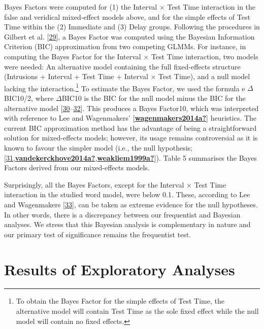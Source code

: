 \documentclass[
]{article}
\begin{document}
Bayes Factors were computed for (1) the Interval \(\times\) Test Time interaction in the false and veridical mixed-effect models above, and for the simple effects of Test Time within the (2) Immediate and (3) Delay groups. Following the procedures in Gilbert et al. {[}\protect\hyperlink{ref-gilbert2018a}{29}{]}, a Bayes Factor was computed using the Bayesian Information Criterion (BIC) approximation from two competing GLMMs. For instance, in computing the Bayes Factor for the Interval \(\times\) Test Time interaction, two models were needed: An alternative model containing the full fixed-effects structure (Intrusions + Interval + Test Time + Interval \(\times\) Test Time), and a null model lacking the interaction.\footnote{To obtain the Bayes Factor for the simple effects of Test Time, the alternative model will contain Test Time as the sole fixed effect while the null model will contain no fixed effects.} To estimate the Bayes Factor, we used the formula e \(\Delta\)BIC10/2, where \(\Delta\)BIC10 is the BIC for the null model minus the BIC for the alternative model {[}\protect\hyperlink{ref-masson2011a}{30}--\protect\hyperlink{ref-wagenmakers2007a}{32}{]}. This produces a Bayes Factor10, which was interpreted with reference to Lee and Wagenmakers' {[}\protect\hyperlink{ref-wagenmakers2014a}{\textbf{wagenmakers2014a?}}{]} heuristics. The current BIC approximation method has the advantage of being a straightforward solution for mixed-effects models; however, its usage remains controversial as it is known to favour the simpler model (i.e., the null hypothesis; {[}\protect\hyperlink{ref-lindelov2018a}{31},\protect\hyperlink{ref-vandekerckhove2014a}{\textbf{vandekerckhove2014a?}},\protect\hyperlink{ref-weakliem1999a}{\textbf{weakliem1999a?}}{]}). Table 5 summarises the Bayes Factors derived from our mixed-effects models.

Surprisingly, all the Bayes Factors, except for the Interval \(\times\) Test Time interaction in the studied word model, were below 0.1. These, according to Lee and Wagenmakers {[}\protect\hyperlink{ref-lee2014a}{33}{]}, can be taken as extreme evidence for the null hypotheses. In other words, there is a discrepancy between our frequentist and Bayesian analyses. We stress that this Bayesian analysis is complementary in nature and our primary test of significance remains the frequentist test.

\hypertarget{results-of-exploratory-analyses}{%
\section{Results of Exploratory Analyses}\label{results-of-exploratory-analyses}}
\end{document}
